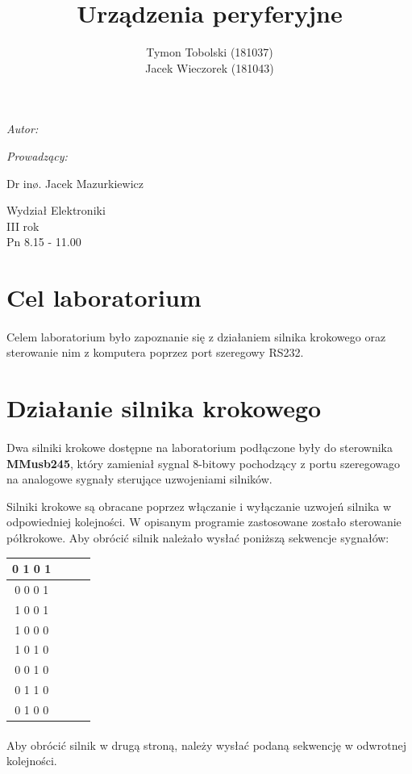 \documentclass[wide,a4paper,titlepage,12pt] {article}
\title{Urządzenia peryferyjne}
\author{Tymon Tobolski (181037)\\ Jacek Wieczorek (181043)}
\makeatletter
\renewcommand{\maketitle}{
\begin{titlepage}
  \begin{center}
    \vspace*{3cm}
    \LARGE \@title \par
    \vspace{2cm}
    \textit{\small Autor:}\par
    \normalsize \@author\par \normalsize
    \vspace{3cm}
    \textit{\small Prowadzący:}\par
    Dr inø. Jacek Mazurkiewicz \par
    \vspace{2cm}
    Wydział Elektroniki\\ III rok\\ Pn 8.15 - 11.00\par
    \vspace{4cm}
    \small \@date
  \end{center}
\end{titlepage}
}
\makeatother
\begin{document}
\maketitle

\section{Cel laboratorium}
\paragraph{}
Celem laboratorium było zapoznanie się z działaniem silnika krokowego
oraz sterowanie nim z komputera poprzez port szeregowy RS232.

\section{Działanie silnika krokowego}
\paragraph{}
Dwa silniki krokowe dostępne na laboratorium podłączone były do sterownika \textbf{MMusb245},
który zamieniał sygnal 8-bitowy pochodzący z portu szeregowago na analogowe sygnały sterujące uzwojeniami silników.

Silniki krokowe są obracane poprzez włączanie i wyłączanie uzwojeń silnika w odpowiedniej kolejności.
W opisanym programie zastosowane zostało sterowanie półkrokowe. Aby obrócić silnik należało wysłać poniższą sekwencje sygnałów:


\begin{center}
    \begin{tabular}{|c|c|c|c|}
    \hline
    0 1 0 1 \\
    \hline
    0 0 0 1 \\
    \hline
    1 0 0 1 \\
    \hline
    1 0 0 0 \\
    \hline
    1 0 1 0 \\
    \hline
    0 0 1 0 \\
    \hline
    0 1 1 0 \\
    \hline
    0 1 0 0 \\
    \hline
   \end{tabular}
\end{center}


\paragraph{}
Aby obrócić silnik w drugą stroną, należy wysłać podaną sekwencję w odwrotnej kolejności.
\end{document}
